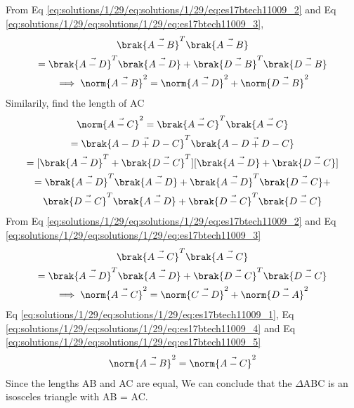 From Eq \eqref{eq:solutions/1/29/eq:solutions/1/29/eq:es17btech11009_2} and Eq \eqref{eq:solutions/1/29/eq:solutions/1/29/eq:es17btech11009_3},
\begin{multline}
    \brak{\vec{A-B}}^{T}\brak{\vec{A-B}}\\
    = \brak{\vec{A-D}}^{T}\brak{\vec{A-D}} + \brak{\vec{D-B}}^{T}\brak{\vec{D-B}}\\
    \implies\norm{\vec{A-B}}^2=\norm{\vec{A-D}}^2 + \norm{\vec{D-B}}^2 \label{eq:solutions/1/29/eq:es17btech11009_4}
\end{multline}
Similarily, find the length of AC
\begin{multline}
 \norm{\vec{A-C}}^2=\brak{\vec{A-C}}^{T}\brak{\vec{A-C}}\\ =\brak{\vec{A-D+D-C}}^{T}\brak{\vec{A-D+D-C}}\\
 = [\brak{\vec{A-D}}^{T}+\brak{\vec{D-C}}^{T}][\brak{\vec{A-D}}+\brak{\vec{D-C}}]\\
 =\brak{\vec{A-D}}^{T}\brak{\vec{A-D}} + \brak{\vec{A-D}}^{T}\brak{\vec{D-C}} +\\ \brak{\vec{D-C}}^{T}\brak{\vec{A-D}} + \brak{\vec{D-C}}^{T}\brak{\vec{D-C}}
\end{multline}
From Eq \eqref{eq:solutions/1/29/eq:solutions/1/29/eq:es17btech11009_2} and Eq \eqref{eq:solutions/1/29/eq:solutions/1/29/eq:es17btech11009_3}
\begin{multline}
    \brak{\vec{A-C}}^{T}\brak{\vec{A-C}}\\
     = \brak{\vec{A-D}}^{T}\brak{\vec{A-D}} + \brak{\vec{D-C}}^{T}\brak{\vec{D-C}}\\
    \implies\norm{\vec{A-C}}^2=\norm{\vec{C-D}}^2 + \norm{\vec{D-A}}^2\label{eq:solutions/1/29/eq:es17btech11009_5}
\end{multline}
Eq \eqref{eq:solutions/1/29/eq:solutions/1/29/eq:es17btech11009_1}, Eq \eqref{eq:solutions/1/29/eq:solutions/1/29/eq:es17btech11009_4} and Eq \eqref{eq:solutions/1/29/eq:solutions/1/29/eq:es17btech11009_5}
\begin{align}
      \norm{\vec{A-B}}^2=\norm{\vec{A-C}}^2 
\end{align}
Since the lengths AB and AC are equal, We can conclude that the $\Delta$ABC is an isosceles triangle with AB = AC.

